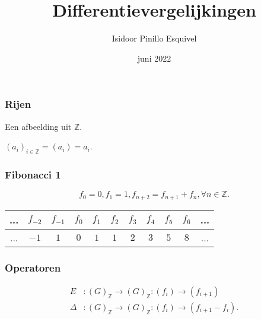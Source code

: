 \documentclass[20pt]{beamer}
\title{Differentievergelijkingen}
\author{Isidoor Pinillo Esquivel }
\date{juni 2022}
\begin{document}
\begin{frame}
    \titlepage
\end{frame}


\begin{frame}
    \frametitle{Rijen}
    \begin{definition}[Rij]
        Een afbeelding uit $\mathbb{Z}$.
    \end{definition}

    \begin{notation}[Rij]
        $(a_i)_{i \in \mathbb{Z}} = (a_i) =a_i$.
    \end{notation}
\end{frame}

\begin{frame}
    \frametitle{Fibonacci 1}
    \vspace*{-2cm}
    $$
        f_0 = 0, f_1 = 1, f_{n+2} = f_{n+1}+f_{n}, \forall n \in \mathbb{Z}.
    $$

    \begin{table}[ht]
        \centering
        \begin{tabular}{|c|c|c|c|c|c|c|c|c|c|c|} \hline
            ... & $f_{-2}$ & $f_{-1}$ & $f_0$ & $f_1$ & $f_2$ & $f_3$ & $f_4$ & $f_5$ & $f_6$ & ... \\ \hline
            ... & $-1$     & $1$      & $0$   & $1$   & $1$   & $2$   & $3$   & $5$   & $8$   & ... \\ \hline
        \end{tabular}
    \end{table}

\end{frame}

\begin{frame}
    \frametitle{Operatoren}
    \begin{definition}[$E , \Delta $]
        \vspace*{-0.5cm}
        \begin{align*}
            E      & :(G)_{\mathbb{Z}} \rightarrow (G)_{\mathbb{Z}} : (f_i) \rightarrow (f_{i+1})        \\
            \Delta & :(G)_{\mathbb{Z}} \rightarrow (G)_{\mathbb{Z}} : (f_i) \rightarrow (f_{i+1}-f_{i}).
        \end{align*}
    \end{definition}
\end{frame}
\end{document}
